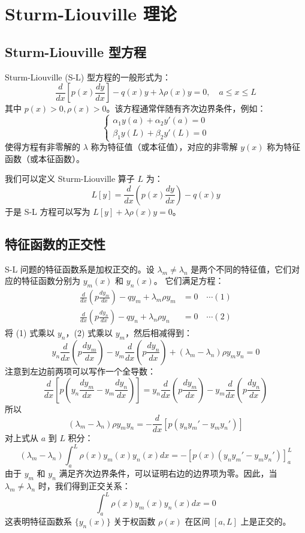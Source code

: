 \documentclass{article}
\begin{document}
	\section{Sturm-Liouville 理论}
	
	
	\subsection{Sturm-Liouville 型方程}
	
	Sturm-Liouville (S-L) 型方程的一般形式为：
	$$
	\frac{d}{dx}\left[p(x)\frac{dy}{dx}\right] - q(x)y + \lambda \rho(x)y = 0, \quad a \le x \le L
	$$
	其中 $p(x)>0, \rho(x)>0$。该方程通常伴随有齐次边界条件，例如：
	$$
	\begin{cases}
		\alpha_1 y(a) + \alpha_2 y'(a) = 0 \\
		\beta_1 y(L) + \beta_2 y'(L) = 0
	\end{cases}
	$$
	使得方程有非零解的 $\lambda$ 称为特征值（或本征值），对应的非零解 $y(x)$ 称为特征函数（或本征函数）。
	
	我们可以定义 Sturm-Liouville 算子 $L$ 为：
	$$
	L[y] = \frac{d}{dx}\left(p(x)\frac{dy}{dx}\right) - q(x)y
	$$
	于是 S-L 方程可以写为 $L[y] + \lambda \rho(x) y = 0$。
	
	\subsection{特征函数的正交性}
	
	S-L 问题的特征函数系是加权正交的。设 $\lambda_m \neq \lambda_n$ 是两个不同的特征值，它们对应的特征函数分别为 $y_m(x)$ 和 $y_n(x)$。
	它们满足方程：
	\begin{align*}
		\frac{d}{dx}\left(p\frac{dy_m}{dx}\right) - qy_m + \lambda_m \rho y_m &= 0 \quad \cdots (1) \\
		\frac{d}{dx}\left(p\frac{dy_n}{dx}\right) - qy_n + \lambda_n \rho y_n &= 0 \quad \cdots (2)
	\end{align*}
	将 (1) 式乘以 $y_n$，(2) 式乘以 $y_m$，然后相减得到：
	$$
	y_n \frac{d}{dx}\left(p\frac{dy_m}{dx}\right) - y_m \frac{d}{dx}\left(p\frac{dy_n}{dx}\right) + (\lambda_m - \lambda_n)\rho y_m y_n = 0
	$$
	注意到左边前两项可以写作一个全导数：
	$$
	\frac{d}{dx}\left[p\left(y_n \frac{dy_m}{dx} - y_m \frac{dy_n}{dx}\right)\right] = y_n \frac{d}{dx}\left(p\frac{dy_m}{dx}\right) - y_m \frac{d}{dx}\left(p\frac{dy_n}{dx}\right)
	$$
	所以
	$$
	(\lambda_m - \lambda_n)\rho y_m y_n = -\frac{d}{dx}\left[p\left(y_n y_m' - y_m y_n'\right)\right]
	$$
	对上式从 $a$ 到 $L$ 积分：
	$$
	(\lambda_m - \lambda_n) \int_a^L \rho(x) y_m(x) y_n(x) dx = - \left[ p(x) (y_n y_m' - y_m y_n') \right]_a^L
	$$
	由于 $y_m$ 和 $y_n$ 满足齐次边界条件，可以证明右边的边界项为零。因此，当 $\lambda_m \neq \lambda_n$ 时，我们得到正交关系：
	$$
	\int_a^L \rho(x) y_m(x) y_n(x) dx = 0
	$$
	这表明特征函数系 $\{y_n(x)\}$ 关于权函数 $\rho(x)$ 在区间 $[a, L]$ 上是正交的。
	
\end{document}
